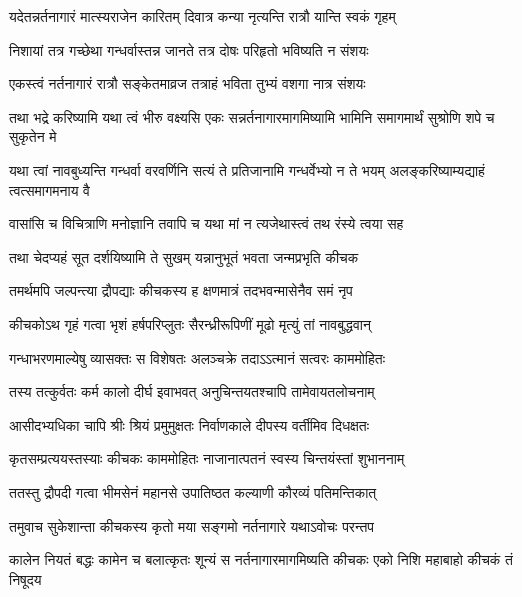 


\twolineshloka
{यदेतन्नर्तनागारं मात्स्यराजेन कारितम्}
{दिवात्र कन्या नृत्यन्ति रात्रौ यान्ति स्वकं गृहम्}


\twolineshloka
{निशायां तत्र गच्छेथा गन्धर्वास्तन्न जानते}
{तत्र दोषः परिहृतो भविष्यति न संशयः}


\twolineshloka
{एकस्त्वं नर्तनागारं रात्रौ सङ्केतमाव्रज}
{तत्राहं भविता तुभ्यं वशगा नात्र संशयः}




\threelineshloka
{तथा भद्रे करिष्यामि यथा त्वं भीरु वक्ष्यसि}
{एकः सन्नर्तनागारमागमिष्यामि भामिनि}
{समागमार्थं सुश्रोणि शपे च सुकृतेन मे}


\threelineshloka
{यथा त्वां नावबुध्यन्ति गन्धर्वा वरवर्णिनि}
{सत्यं ते प्रतिजानामि गन्धर्वेभ्यो न ते भयम्}
{अलङ्करिष्याम्यद्याहं त्वत्समागमनाय वै}


\twolineshloka
{वासांसि च विचित्राणि मनोज्ञानि तवापि च}
{यथा मां न त्यजेथास्त्वं तथ रंस्ये त्वया सह}




\twolineshloka
{तथा चेदप्यहं सूत दर्शयिष्यामि ते सुखम्}
{यन्नानुभूतं भवता जन्मप्रभृति कीचक}



\twolineshloka
{तमर्थमपि जल्पन्त्या द्रौपद्याः कीचकस्य ह}
{क्षणमात्रं तदभवन्मासेनैव समं नृप}


\twolineshloka
{कीचकोऽथ गृहं गत्वा भृशं हर्षपरिप्लुतः}
{सैरन्ध्रीरूपिणीं मूढो मृत्युं तां नावबुद्धवान्}


\twolineshloka
{गन्धाभरणमाल्येषु व्यासक्तः स विशेषतः}
{अलञ्चक्रे तदाऽऽत्मानं सत्वरः काममोहितः}


\twolineshloka
{तस्य तत्कुर्वतः कर्म कालो दीर्घ इवाभवत्}
{अनुचिन्तयतश्चापि तामेवायतलोचनाम्}


\twolineshloka
{आसीदभ्यधिका चापि श्रीः श्रियं प्रमुमुक्षतः}
{निर्वाणकाले दीपस्य वर्तीमिव दिधक्षतः}


\twolineshloka
{कृतसम्प्रत्ययस्तस्याः कीचकः काममोहितः}
{नाजानात्पतनं स्वस्य चिन्तयंस्तां शुभाननाम्}


\twolineshloka
{ततस्तु द्रौपदी गत्वा भीमसेनं महानसे}
{उपातिष्ठत कल्याणी कौरव्यं पतिमन्तिकात्}


\twolineshloka
{तमुवाच सुकेशान्ता कीचकस्य कृतो मया}
{सङ्गमो नर्तनागारे यथाऽवोचः परन्तप}


\threelineshloka
{कालेन नियतं बद्धः कामेन च बलात्कृतः}
{शून्यं स नर्तनागारमागमिष्यति कीचकः}
{एको निशि महाबाहो कीचकं तं निषूदय}


